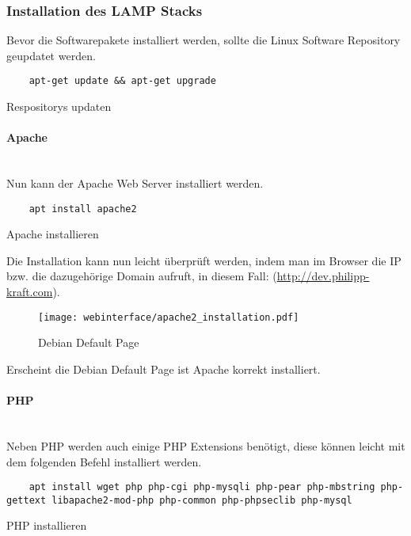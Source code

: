 \subsubsection{Installation des LAMP Stacks}
Bevor die Softwarepakete installiert werden, sollte die Linux Software
Repository geupdatet werden.

\begin{listing}[H]
  \begin{verbatim}
    apt-get update && apt-get upgrade
  \end{verbatim}
  \caption{Respositorys updaten}
\end{listing}

\paragraph{Apache}\mbox{}\\

Nun kann der Apache Web Server installiert werden.

\begin{listing}[H]
  \begin{verbatim}
    apt install apache2
  \end{verbatim}
  \caption{Apache installieren}
\end{listing}

Die Installation kann nun leicht überprüft werden, indem man im Browser die IP
bzw. die dazugehörige Domain aufruft, in diesem Fall:
(\url{http://dev.philipp-kraft.com}).

\begin{figure}[H]
  \centering
  \texttt{[image: webinterface/apache2\_installation.pdf]}
  \caption{Debian Default Page}
\end{figure}

Erscheint die Debian Default Page ist Apache korrekt installiert.

\paragraph{PHP}\mbox{}\\
Neben PHP werden auch einige PHP Extensions benötigt, diese können leicht mit
dem folgenden Befehl installiert werden.

\begin{listing}[H]
  \begin{verbatim}
    apt install wget php php-cgi php-mysqli php-pear php-mbstring php-gettext libapache2-mod-php php-common php-phpseclib php-mysql
  \end{verbatim}
  \caption{PHP installieren}
\end{listing}

